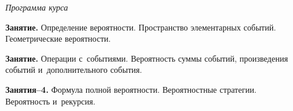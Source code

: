 



\vspace{-1ex}
\emph{Программа курса}
\vspace{+1ex}

\textbf{Занятие.}\enspace
Определение вероятности.
Пространство элементарных событий.
Геометрические вероятности.

\textbf{Занятие.}\enspace
Операции с~событиями.
Вероятность суммы событий, произведения событий и~дополнительного события.

\textbf{Занятия--4.}\enspace
Формула полной вероятности.
Вероятностные стратегии.
Вероятность и~рекурсия.

